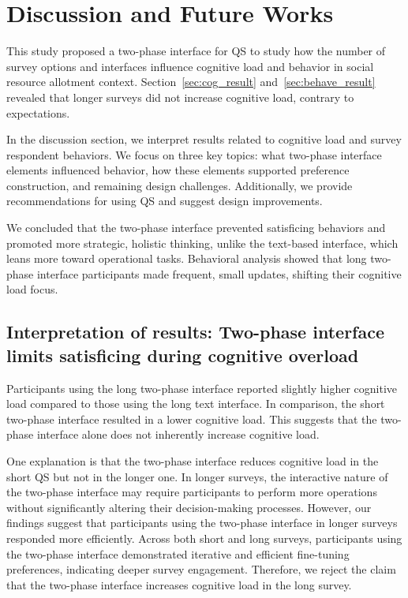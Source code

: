 \section{Discussion and Future Works}
\label{sec:discussion}
This study proposed a two-phase interface for QS to study how the number of survey options and interfaces influence cognitive load and behavior in social resource allotment context. Section~\ref{sec:cog_result} and~\ref{sec:behave_result} revealed that longer surveys did not increase cognitive load, contrary to expectations.

In the discussion section, we interpret results related to cognitive load and survey respondent behaviors. We focus on three key topics: what two-phase interface elements influenced behavior, how these elements supported preference construction, and remaining design challenges. Additionally, we provide recommendations for using QS and suggest design improvements.

We concluded that the two-phase interface prevented satisficing behaviors and promoted more strategic, holistic thinking, unlike the text-based interface, which leans more toward operational tasks. Behavioral analysis showed that long two-phase interface participants made frequent, small updates, shifting their cognitive load focus.

\subsection{Interpretation of results: Two-phase interface limits satisficing during cognitive overload} \label{sec:satisficing}

Participants using the long two-phase interface reported slightly higher cognitive load compared to those using the long text interface. In comparison, the short two-phase interface resulted in a lower cognitive load. This suggests that the two-phase interface alone does not inherently increase cognitive load.

One explanation is that the two-phase interface reduces cognitive load in the short QS but not in the longer one. In longer surveys, the interactive nature of the two-phase interface may require participants to perform more operations without significantly altering their decision-making processes. However, our findings suggest that participants using the two-phase interface in longer surveys responded more efficiently. Across both short and long surveys, participants using the two-phase interface demonstrated iterative and efficient fine-tuning preferences, indicating deeper survey engagement. Therefore, we reject the claim that the two-phase interface increases cognitive load in the long survey.

